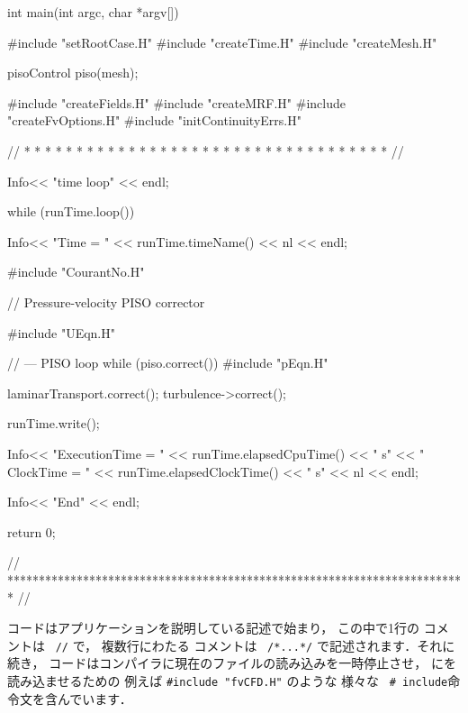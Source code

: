 \begin{OFverbatim}
int main(int argc, char *argv[])
{
    #include "setRootCase.H"
    #include "createTime.H"
    #include "createMesh.H"

    pisoControl piso(mesh);

    #include "createFields.H"
    #include "createMRF.H"
    #include "createFvOptions.H"
    #include "initContinuityErrs.H"

    // * * * * * * * * * * * * * * * * * * * * * * * * * * * * * * * * * * * //

    Info<< "\nStarting time loop\n" << endl;

    while (runTime.loop())
    {
        Info<< "Time = " << runTime.timeName() << nl << endl;

        #include "CourantNo.H"

        // Pressure-velocity PISO corrector
        {
            #include "UEqn.H"

            // --- PISO loop
            while (piso.correct())
            {
                #include "pEqn.H"
            }
        }

        laminarTransport.correct();
        turbulence->correct();

        runTime.write();

        Info<< "ExecutionTime = " << runTime.elapsedCpuTime() << " s"
            << "  ClockTime = " << runTime.elapsedClockTime() << " s"
            << nl << endl;
    }

    Info<< "End\n" << endl;

    return 0;
}


// ************************************************************************* //
\end{OFverbatim}
コードはアプリケーションを説明している記述で始まり，
この中で1行の
%
コメントは\ 
%
%
\verb|//| で，
複数行にわたる
%
コメントは\ 
%
%
\verb|/*...*/| で記述されます．それに続き，
コードはコンパイラに現在のファイルの読み込みを一時停止させ，
にを読み込ませるための
例えば \verb|#include "fvCFD.H"| のような
様々な\ 
%
%
\verb|# include|命令文を含んでいます．

